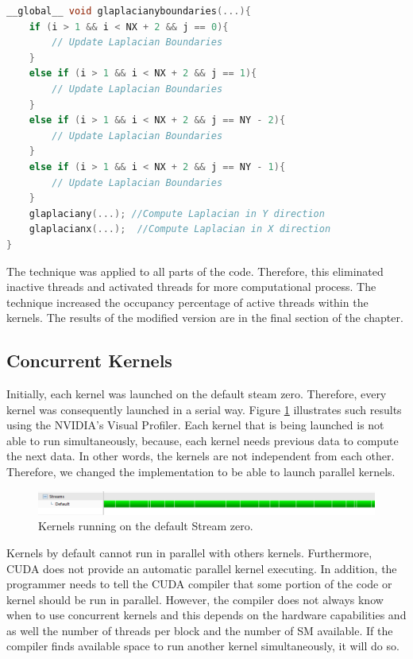 \begin{lstlisting}[language=C++, label={lst:newcde}, caption={More workload on a single kernel execution}]
__global__ void glaplacianyboundaries(...){
    if (i > 1 && i < NX + 2 && j == 0){
     	// Update Laplacian Boundaries
    }
    else if (i > 1 && i < NX + 2 && j == 1){
  		// Update Laplacian Boundaries
    }
    else if (i > 1 && i < NX + 2 && j == NY - 2){
        // Update Laplacian Boundaries
    }
    else if (i > 1 && i < NX + 2 && j == NY - 1){
        // Update Laplacian Boundaries
    }
    glaplaciany(...); //Compute Laplacian in Y direction
	glaplacianx(...);  //Compute Laplacian in X direction
}
\end{lstlisting}

The technique was applied to all parts of the code. Therefore, this eliminated inactive threads and activated threads for more computational process. The technique increased the occupancy percentage of active threads within the kernels. The results of the modified version are in the final section of the chapter.

\subsection{Concurrent Kernels}

Initially, each kernel was launched on the default steam zero. Therefore, every kernel was consequently launched in a serial way. Figure \ref{fig:streams} illustrates such results using the NVIDIA's Visual Profiler. Each kernel that is being launched is not able to run simultaneously, because, each kernel needs previous data to compute the next data. In other words, the kernels are not independent from each other. Therefore, we changed the implementation to be able to launch parallel kernels.

\begin{figure}[htbp]
	\centering
		\includegraphics[width=1.0\textwidth]{Figures/ini_steams.png}
		\smallskip
	\caption[Initial Streams]{Kernels running on the default Stream zero.
}
	\label{fig:streams}
\end{figure}

 Kernels by default cannot run in parallel with others kernels. Furthermore, CUDA does not provide an automatic parallel kernel executing. In addition, the programmer needs to tell the CUDA compiler that some portion of the code or kernel should be run in parallel. However, the compiler does not always know when to use concurrent kernels and this depends on the hardware capabilities and as well the number of threads per block and the number of SM available. If the compiler finds available space to run another kernel simultaneously, it will do so. 

